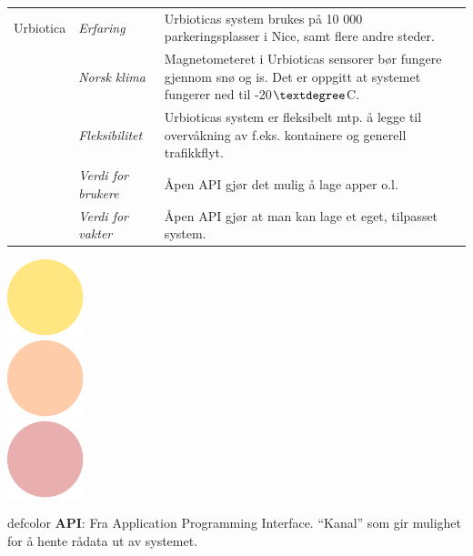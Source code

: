 \documentclass[xetex]{beamer}
\begin{document}
\begin{frame}
	\vspace{4em}
	\begin{tabular}{llp{7cm}}
		\alert{Urbiotica} 	& \emph{Erfaring} 		& Urbioticas system \alert{brukes på 10 000 parkeringsplasser i Nice}, samt flere andre steder. \\ [0.5em]
							& \emph{Norsk klima} 	& Magnetometeret i Urbioticas sensorer \alert{bør fungere gjennom snø og is}. Det er oppgitt at systemet \alert{fungerer ned til -20$\textdegree$C.} \\ [0.5em]
							& \emph{Fleksibilitet} 	& Urbioticas system er \alert{fleksibelt} mtp. å legge til overvåkning av f.eks. kontainere og generell trafikkflyt. \\ [0.5em]
							& \emph{Verdi for brukere} & Åpen API gjør det mulig å lage apper o.l. \\ [0.5em]
							& \emph{Verdi for vakter} & Åpen API gjør at man kan lage et eget, tilpasset system. \\
	\end{tabular}
	
	\vspace{4em}
	\hspace{20em}\includegraphics[scale=0.5]{grafikk/dummy/circ5.pdf}\\ [-3.5em] 
	\hspace{25em}\includegraphics[scale=0.5]{grafikk/dummy/circ4.pdf}\\ [-3.5em]
	\hspace{30em}\includegraphics[scale=0.5]{grafikk/dummy/circ3.pdf}\\ 
	\vspace{5em}
	
	\vspace{3em}
	\hfill\begin{beamercolorbox}[wd=0.50\paperwidth, ht=5.5ex, dp=5pt, leftskip=.3cm, rightskip=.3cm]{defcolor}
    \tiny
    \textbf{API}: Fra Application Programming Interface. “Kanal” som gir mulighet for å hente rådata ut av systemet.

	\end{beamercolorbox}	
\end{frame}
\end{document}
